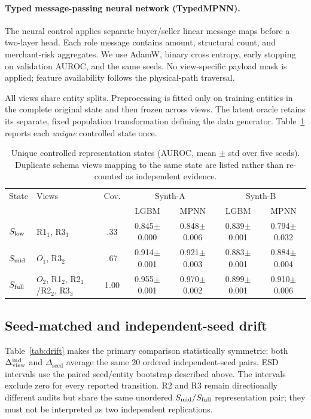 \documentclass[runningheads]{llncs}
\newcommand{\Dview}{\Delta_{\mathrm{view}}}
\newcommand{\Dseed}{\Delta_{\mathrm{seed}}}
\begin{document}
\paragraph{Typed message-passing neural network (TypedMPNN).} The neural control applies separate buyer/seller linear message maps before a two-layer head. Each role message contains amount, structural count, and merchant-risk aggregates. We use AdamW, binary cross entropy, early stopping on validation AUROC, and the same seeds. No view-specific payload mask is applied; feature availability follows the physical-path traversal.

All views share entity splits. Preprocessing is fitted only on training entities in the complete original state and then frozen across views. The latent oracle retains its separate, fixed population transformation defining the data generator. Table~\ref{tab:auc} reports each \emph{unique} controlled state once.

\begin{table}[t]
\centering
\caption{Unique controlled representation states (AUROC, mean $\pm$ std over five seeds). Duplicate schema views mapping to the same state are listed rather than re-counted as independent evidence.}
\label{tab:auc}
\scriptsize
\setlength{\tabcolsep}{2.2pt}
\begin{tabular}{llccccc}
\toprule
State & Views & Cov. & \multicolumn{2}{c}{Synth-A} & \multicolumn{2}{c}{Synth-B}\\
 & & & LGBM & MPNN & LGBM & MPNN\\
\midrule
$S_{\rm low}$ & R1$_1$, R3$_1$ & .33 & 0.845$\pm$0.000 & 0.848$\pm$0.006 & 0.839$\pm$0.001 & 0.794$\pm$0.032\\
$S_{\rm mid}$ & $O_1$, R3$_2$ & .67 & 0.914$\pm$0.001 & 0.921$\pm$0.003 & 0.883$\pm$0.001 & 0.884$\pm$0.004\\
$S_{\rm full}$ & $O_2$, R1$_2$, R2$_1$/R2$_2$, R3$_3$ & 1.00 & 0.955$\pm$0.001 & 0.970$\pm$0.002 & 0.899$\pm$0.001 & 0.910$\pm$0.006\\
\bottomrule
\end{tabular}
\end{table}

\subsection{Seed-matched and independent-seed drift}
Table~\ref{tab:drift} makes the primary comparison statistically symmetric: both $\Dview^{\rm ind}$ and $\Dseed$ average the same 20 ordered independent-seed pairs. ESD intervals use the paired seed/entity bootstrap described above. The intervals exclude zero for every reported transition. R2 and R3 remain directionally different audits but share the same unordered $S_{\rm mid}/S_{\rm full}$ representation pair; they must not be interpreted as two independent replications.
\end{document}

